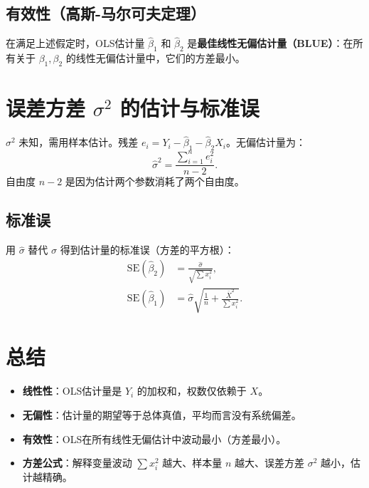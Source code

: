 \documentclass[12pt]{article}
\begin{document}
\subsection{有效性（高斯-马尔可夫定理）}
在满足上述假定时，OLS估计量 $\hat{\beta}_1$ 和 $\hat{\beta}_2$ 是\textbf{最佳线性无偏估计量（BLUE）}：在所有关于 $\beta_1, \beta_2$ 的线性无偏估计量中，它们的方差最小。

\section{误差方差 $\sigma^2$ 的估计与标准误}
$\sigma^2$ 未知，需用样本估计。残差 $e_i = Y_i - \hat{\beta}_1 - \hat{\beta}_2 X_i$。无偏估计量为：
\[
\hat{\sigma}^2 = \frac{\sum_{i=1}^n e_i^2}{n-2}.
\]
自由度 $n-2$ 是因为估计两个参数消耗了两个自由度。

\subsection{标准误}
用 $\hat{\sigma}$ 替代 $\sigma$ 得到估计量的标准误（方差的平方根）：
\begin{align*}
\mathrm{SE}(\hat{\beta}_2) &= \frac{\hat{\sigma}}{\sqrt{\sum x_i^2}},\\
\mathrm{SE}(\hat{\beta}_1) &= \hat{\sigma} \sqrt{\frac{1}{n} + \frac{\bar{X}^2}{\sum x_i^2}}.
\end{align*}

\section*{总结}
\begin{itemize}
    \item \textbf{线性性}：OLS估计量是 $Y_i$ 的加权和，权数仅依赖于 $X$。
    \item \textbf{无偏性}：估计量的期望等于总体真值，平均而言没有系统偏差。
    \item \textbf{有效性}：OLS在所有线性无偏估计中波动最小（方差最小）。
    \item \textbf{方差公式}：解释变量波动 $\sum x_i^2$ 越大、样本量 $n$ 越大、误差方差 $\sigma^2$ 越小，估计越精确。
\end{itemize}
\end{document}
